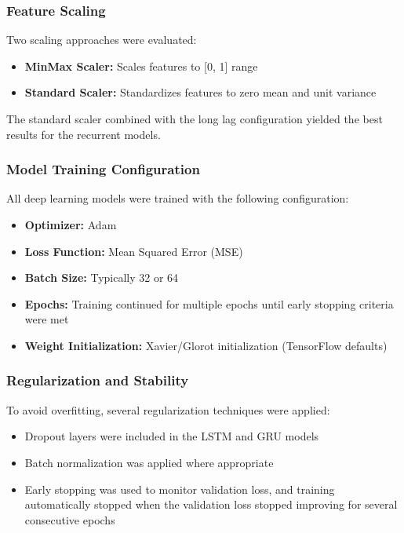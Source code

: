 \documentclass[oneside, 12pt]{book}
\numberwithin{equation}{chapter}
\begin{document}
\subsubsection{Feature Scaling}

Two scaling approaches were evaluated:
\begin{itemize}
    \item \textbf{MinMax Scaler:} Scales features to [0, 1] range
    \item \textbf{Standard Scaler:} Standardizes features to zero mean and unit variance
\end{itemize}

The standard scaler combined with the long lag configuration yielded the best results for the recurrent models.

\subsubsection{Model Training Configuration}

All deep learning models were trained with the following configuration:
\begin{itemize}
    \item \textbf{Optimizer:} Adam
    \item \textbf{Loss Function:} Mean Squared Error (MSE)
    \item \textbf{Batch Size:} Typically 32 or 64
    \item \textbf{Epochs:} Training continued for multiple epochs until early stopping criteria were met
    \item \textbf{Weight Initialization:} Xavier/Glorot initialization (TensorFlow defaults)
\end{itemize}

\subsubsection{Regularization and Stability}

To avoid overfitting, several regularization techniques were applied:
\begin{itemize}
    \item Dropout layers were included in the LSTM and GRU models
    \item Batch normalization was applied where appropriate
    \item Early stopping was used to monitor validation loss, and training automatically stopped when the validation loss stopped improving for several consecutive epochs
\end{itemize}
\end{document}
